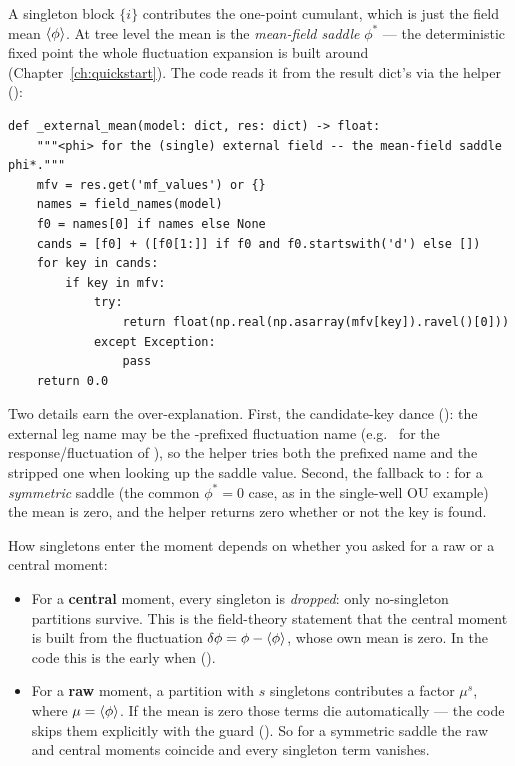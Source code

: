 A singleton block $\{i\}$ contributes the one-point cumulant, which is just the
field mean $\left\langle \phi \right\rangle$. At tree level the mean is the \emph{mean-field saddle}
$\phi^{*}$ --- the deterministic fixed point the whole fluctuation expansion is
built around (Chapter~\ref{ch:quickstart}). The code reads it from the result
dict's  via the helper 
():

\begin{lstlisting}
def _external_mean(model: dict, res: dict) -> float:
    """<phi> for the (single) external field -- the mean-field saddle phi*."""
    mfv = res.get('mf_values') or {}
    names = field_names(model)
    f0 = names[0] if names else None
    cands = [f0] + ([f0[1:]] if f0 and f0.startswith('d') else [])
    for key in cands:
        if key in mfv:
            try:
                return float(np.real(np.asarray(mfv[key]).ravel()[0]))
            except Exception:
                pass
    return 0.0
\end{lstlisting}

Two details earn the over-explanation. First, the candidate-key dance
(): the external leg name may be the -prefixed
fluctuation name (e.g.\  for the response/fluctuation of ), so
the helper tries both the prefixed name and the stripped one when looking up the
saddle value. Second, the fallback to : for a \emph{symmetric} saddle
(the common $\phi^{*}=0$ case, as in the single-well OU example) the mean is
zero, and the helper returns zero whether or not the key is found.

How singletons enter the moment depends on whether you asked for a raw or a
central moment:
\begin{itemize}
  \item For a \textbf{central} moment, every singleton is \emph{dropped}: only
        no-singleton partitions survive. This is the field-theory statement that
        the central moment is built from the fluctuation $\delta\phi=\phi-\left\langle \phi \right\rangle$,
        whose own mean is zero. In the code this is the early
         when 
        ().
  \item For a \textbf{raw} moment, a partition with $s$ singletons contributes a
        factor $\mu^{s}$, where $\mu=\left\langle \phi \right\rangle$. If the mean is zero those terms
        die automatically --- the code skips them explicitly with the
         guard ().
        So for a symmetric saddle the raw and central moments coincide and every
        singleton term vanishes.
\end{itemize}

